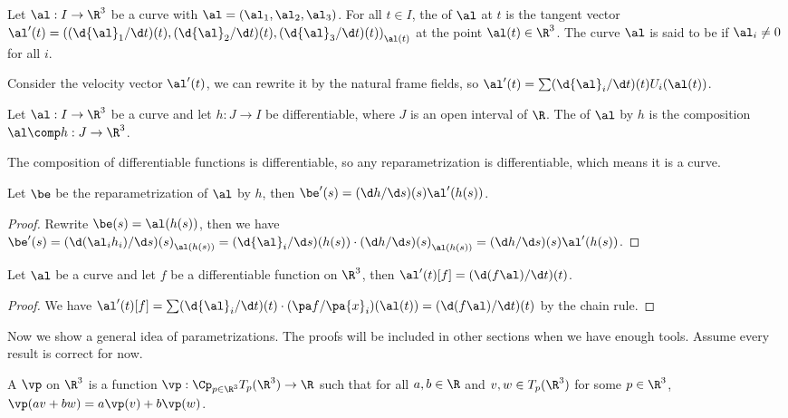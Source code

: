 \documentclass[10pt]{article}
\begin{document}
\begin{definition}
    Let $\al:I\to{\R}^{3}$ be a curve with $\al=({\al}_{1},{\al}_{2},{\al}_{3})$. For all $t\in I$, the  of $\al$ at $t$ is the tangent vector $\al'(t)={((\d{\al}_{1}/\d t)(t),(\d{\al}_{2}/\d t)(t),(\d{\al}_{3}/\d t)(t))}_{\al(t)}$ at the point $\al(t)\in{\R}^{3}$. The curve $\al$ is said to be  if ${\al}_{i}\ne 0$ for all $i$.
\end{definition}
\par
Consider the velocity vector $\al'(t)$, we can rewrite it by the natural frame fields, so $\al'(t)=\sum(\d{\al}_{i}/\d t)(t){U}_{i}(\al(t))$.
\begin{definition}
    Let $\al:I\to{\R}^{3}$ be a curve and let $h:J\to I$ be differentiable, where $J$ is an open interval of $\R$. The  of $\al$ by $h$ is the composition $\al\comp h:J\to{\R}^{3}$.
\end{definition}
\par
The composition of differentiable functions is differentiable, so any reparametrization is differentiable, which means it is a curve.
\begin{proposition}
    Let $\be$ be the reparametrization of $\al$ by $h$, then $\be'(s)=(\d h/\d s)(s)\al'(h(s))$.
\end{proposition}
\begin{proof}
    Rewrite $\be(s)=\al(h(s))$, then we have $\be'(s)={(\d({\al}_{i}{h}_{i})/\d s)(s)}_{\al(h(s))}={(\d{\al}_{i}/\d s)(h(s))\cdot(\d h/\d s)(s)}_{\al(h(s))}=(\d h/\d s)(s)\al'(h(s))$.
\end{proof}
\begin{proposition}
    Let $\al$ be a curve and let $f$ be a differentiable function on ${\R}^{3}$, then $\al'(t)[f]=(\d(f\al)/\d t)(t)$.
\end{proposition}
\begin{proof}
    We have $\al'(t)[f]=\sum(\d{\al}_{i}/\d t)(t)\cdot(\pa f/\pa{x}_{i})(\al(t))=(\d(f\al)/\d t)(t)$ by the chain rule.
\end{proof}
\par
Now we show a general idea of parametrizations. The proofs will be included in other sections when we have enough tools. Assume every result is correct for now.
\begin{definition}
    A  $\vp$ on ${\R}^{3}$ is a function $\vp:{\Cp}_{p\in{\R}^{3}}{T}_{p}({\R}^{3})\to\R$ such that for all $a,b\in\R$ and $v,w\in{T}_{p}({\R}^{3})$ for some $p\in{\R}^{3}$, $\vp(av+bw)=a\vp(v)+b\vp(w)$.
\end{definition}
\end{document}
